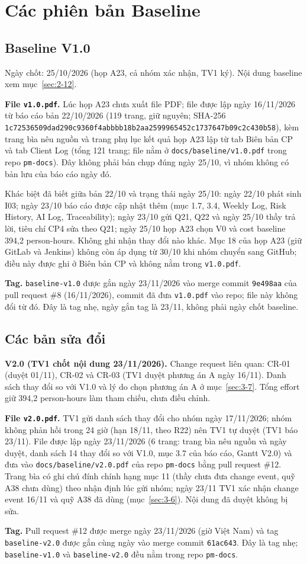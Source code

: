\chapter{Các phiên bản Baseline}
\label{app:baselines}

\section{Baseline V1.0}
Ngày chốt: 25/10/2026 (họp A23, cả nhóm xác nhận, TV1 ký). Nội dung baseline xem mục~\ref{sec:2-12}.

\textbf{File \texttt{v1.0.pdf}.} Lúc họp A23 chưa xuất file PDF; file được lập ngày 16/11/2026 từ báo cáo bản 22/10/2026 (119 trang, giữ nguyên; SHA-256 \texttt{1c72536509dad290c9360f4abbbb18b2\allowbreak aa2599965452c1737647b09c2c430b58}), kèm trang bìa nêu nguồn và trang phụ lục kết quả họp A23 lập từ tab Biên bản CP và tab Client Log (tổng 121 trang; file nằm ở \texttt{docs/\allowbreak baseline/\allowbreak v1.0.pdf} trong repo \texttt{pm-docs}). Đây không phải bản chụp đúng ngày 25/10, vì nhóm không có bản lưu của báo cáo ngày đó.

Khác biệt đã biết giữa bản 22/10 và trạng thái ngày 25/10: ngày 22/10 phát sinh I03; ngày 23/10 báo cáo được cập nhật thêm (mục 1.7, 3.4, Weekly Log, Risk History, AI Log, Traceability); ngày 23/10 gửi Q21, Q22 và ngày 25/10 thầy trả lời, tiêu chí CP4 sửa theo Q21; ngày 25/10 họp A23 chọn V0 và cost baseline 394,2 person-hours. Không ghi nhận thay đổi nào khác. Mục 18 của họp A23 (giữ GitLab và Jenkins) không còn áp dụng từ 30/10 khi nhóm chuyển sang GitHub; điều này được ghi ở Biên bản CP và không nằm trong \texttt{v1.0.pdf}.

\textbf{Tag.} \texttt{baseline-v1.0} được gắn ngày 23/11/2026 vào merge commit \texttt{9e498aa} của pull request \#8 (16/11/2026), commit đã đưa \texttt{v1.0.pdf} vào repo; file này không đổi từ đó. Đây là tag nhẹ, ngày gắn tag là 23/11, không phải ngày chốt baseline.

\section{Các bản sửa đổi}
\textbf{V2.0 (TV1 chốt nội dung 23/11/2026).} Change request liên quan: CR-01 (duyệt 01/11), CR-02 và CR-03 (TV1 duyệt phương án A ngày 16/11). Danh sách thay đổi so với V1.0 và lý do chọn phương án A ở mục~\ref{sec:3-7}. Tổng effort giữ 394,2 person-hours làm tham chiếu, chưa điều chỉnh.

\textbf{File \texttt{v2.0.pdf}.} TV1 gửi danh sách thay đổi cho nhóm ngày 17/11/2026; nhóm không phản hồi trong 24 giờ (hạn 18/11, theo R22) nên TV1 tự duyệt (TV1 báo 23/11). File được lập ngày 23/11/2026 (6 trang: trang bìa nêu nguồn và ngày duyệt, danh sách 14 thay đổi so với V1.0, mục 3.7 của báo cáo, Gantt V2.0) và đưa vào \texttt{docs/\allowbreak baseline/\allowbreak v2.0.pdf} của repo \texttt{pm-docs} bằng pull request \#12. Trang bìa có ghi chú đính chính hạng mục 11 (thầy chưa đưa change event, quỹ A38 chưa dùng) theo nhận định lúc gửi nhóm; ngày 23/11 TV1 xác nhận change event 16/11 và quỹ A38 đã dùng (mục~\ref{sec:3-6}). Nội dung đã duyệt không bị sửa.

\textbf{Tag.} Pull request \#12 được merge ngày 23/11/2026 (giờ Việt Nam) và tag \texttt{baseline-v2.0} được gắn cùng ngày vào merge commit \texttt{61ac643}. Đây là tag nhẹ; \texttt{baseline-v1.0} và \texttt{baseline-v2.0} đều nằm trong repo \texttt{pm-docs}.

